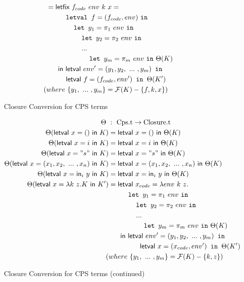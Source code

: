 \documentclass{article}
\theoremstyle{definition}
\theoremstyle{remark}
\numberwithin{equation}{section}
\begin{document}
\begin{figure}[!ht]
\begin{align*}
    &=\textsf{letfix }f_{code}\ env\ k\ x=\\
    &\kern1cm   \texttt{letval }f=(f_{code}, env)\ \texttt{in}\\
    &\kern1.4cm   \texttt{let }y_1=\pi _1\ env\ \texttt{in}\\
    &\kern1.8cm   \texttt{let }y_2=\pi _2\ env\ \texttt{in}\\
    &\kern1.8cm   ...\\
    &\kern2.2cm   \texttt{let }y_m=\pi _m\ env\ \texttt{in}\ \Theta(K)\\
    &\kern0.6cm\textsf{in letval }env'=(y_1, y_2, \ ...\ ,y_m)\texttt{ in}\\
    &\kern1cm\textsf{letval }f=(f_{code}, env')\texttt{ in }\Theta(K')\\  %
    (&where\ \{y_1,\ ...\ ,y_m\}=\mathcal{F}(K)-\{f,k,x\})
\end{align*}
  \caption{Closure Conversion for CPS terms}
  \label{fig-sub}
\end{figure}

\begin{figure}[!ht]
  \centering
\begin{align*}
\Theta\ &:\ \textrm{Cps.t} \to \textrm{Closure.t}\\     %
\Theta(\textsf{letval }x=()\textsf{ in }K)
    &=\textsf{letval }x=()\textsf{ in }\Theta(K)\\   %
\Theta(\textsf{letval }x=i\textsf{ in }K)
    &=\textsf{letval }x=i\textsf{ in }\Theta(K)\\   %
\Theta(\textsf{letval }x="s"\textsf{ in }K)
    &=\textsf{letval }x="s"\textsf{ in }\Theta(K)\\   %
\Theta(\textsf{letval }x=(x_1, x_2,\ ...\ , x_n)\textsf{ in }K)
    &=\textsf{letval }x=(x_1, x_2,\ ...\ , x_n)\textsf{ in }
    \Theta(K)\\ %
\Theta(\textsf{letval }x=\textsf{in}_i\ y\textsf{ in }K)
    &=\textsf{letval }x=\textsf{in}_i\ y\textsf{ in }\Theta(K)\\%
\Theta(\textsf{letval }x=\lambda k\ z.K\textsf{ in }K')
    &=\textsf{letval }x_{code}=\lambda env\ k\ z.\\
    &\kern1cm   \texttt{let }y_1=\pi _1\ env\ \texttt{in}\\
    &\kern1.4cm   \texttt{let }y_2=\pi _2\ env\ \texttt{in}\\
    &\kern1.4cm   ...\\
    &\kern1.8cm   \texttt{let }y_m=\pi _m\ env\ \texttt{in}\ \Theta(K)\\
    &\kern0.6cm\textsf{in letval }env'=(y_1, y_2, \ ...\ ,y_m)\texttt{ in}\\
    &\kern1.6cm\textsf{letval }x=(x_{code}, env')\texttt{ in }\Theta(K')\\
    (&where\ \{y_1,\ ...\ ,y_m\}=\mathcal{F}(K)-\{k, z\})%
\end{align*}
  \caption{Closure Conversion for CPS terms (continued)}
  \label{fig-sub}
\end{figure}
\end{document}
